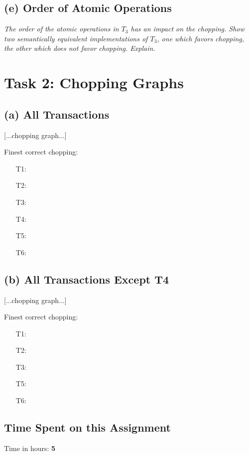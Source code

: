\documentclass[11pt]{scrartcl}
\begin{document}
\subsection*{(e) Order of Atomic Operations}

{\it The order of the atomic operations in $T_3$ has an impact on the
  chopping. Show two semantically equivalent implementations of $T_3$,
  one which favors chopping, the other which does not favor
  chopping. Explain.}


\section*{Task 2: Chopping Graphs}

\subsection*{(a) All Transactions}

\medskip

[...chopping graph...]

\medskip

\noindent Finest correct chopping:
\begin{enumerate}
\item[T1:]
\item[T2:]
\item[T3:] 
\item[T4:]
\item[T5:]
\item[T6:] 
\end{enumerate}


\subsection*{(b) All Transactions Except T4}

\medskip

[...chopping graph...]

\medskip

\noindent Finest correct chopping:
\begin{enumerate}
\item[T1:]
\item[T2:]
\item[T3:] 
\item[T5:]
\item[T6:] 
\end{enumerate}


\subsection*{Time Spent on this Assignment}

Time in hours: {\bf 5}


\end{document}
